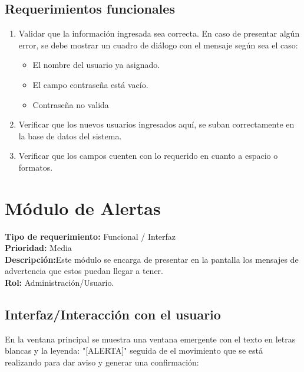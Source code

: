 \documentclass[a4paper,DIV=12]{scrreprt}
\begin{document}
\subsection*{Requerimientos funcionales}
\begin{enumerate}
	\item{Validar que la información ingresada sea correcta.
 En caso de presentar algún error, se debe mostrar un cuadro de diálogo con el mensaje según sea el caso: 
 }
	\begin{itemize}
		\item{El nombre del usuario ya asignado. }
		\item{El campo contraseña está vacío. }
		\item{Contraseña no valida }
	\end{itemize}
	\item{Verificar que los nuevos usuarios ingresados aquí, se suban correctamente en la base de datos del sistema. }
	\item{Verificar que los campos cuenten con lo requerido en cuanto a espacio o formatos. }	
\end{enumerate}


\newpage

\newpage
\setcounter{chapter}{4}
\setcounter{section}{-1}
\setcounter{subsection}{-1}
\section{Módulo de Alertas}
\noindent
\textbf{Tipo de requerimiento:} Funcional / Interfaz\\
\textbf{Prioridad:} Media\\
\textbf{Descripción:}Este módulo se encarga de presentar en la pantalla los mensajes de advertencia que estos puedan llegar a tener. \\
\textbf{Rol:} Administración/Usuario.

\subsection*{Interfaz/Interacción con el usuario}
En la ventana principal se muestra una ventana emergente con el texto en letras blancas y la leyenda:
"[ALERTA]" seguida de el movimiento que se está realizando para dar aviso y generar una confirmación:\\
\end{document}

